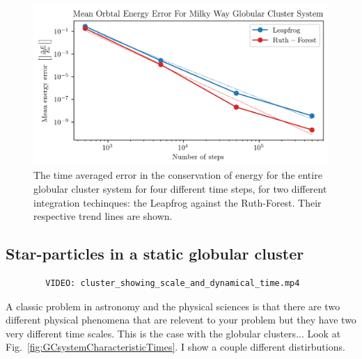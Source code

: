         \begin{figure}
            \centering
            \includegraphics[width=\linewidth]{images/numericalErrorMeanEnergyErrorRuthForestLeapFrog.png}
            \caption{The time averaged error in the conservation of energy for the entire globular cluster system for four different time steps, for two different integration techinques: the Leapfrog against the Ruth-Forest. Their respective trend lines are shown.}
            \label{fig:numericalErrorMeanEnergyErrorRuthForestLeapFrog}
        \end{figure}

    \subsection{Star-particles in a static globular cluster}

        \begin{verbatim}
        VIDEO: cluster_showing_scale_and_dynamical_time.mp4
        \end{verbatim}
        
        A classic problem in astronomy and the physical sciences is that there are two different physical phenomena that are relevent to your problem but they have two very different time scales. This is the case with the globular clusters... Look at Fig.~\ref{fig:GCsystemCharacteristicTimes}. I show a couple different distirbutions.  

